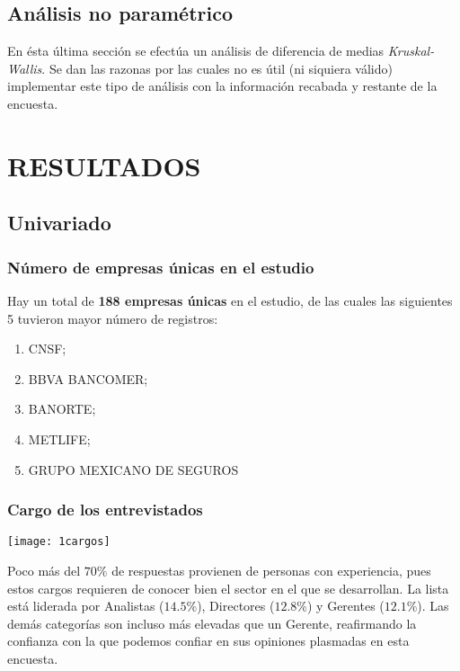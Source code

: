 \documentclass{article}
\begin{document}
\subsection{Análisis no paramétrico}

En ésta última sección se efectúa un análisis de diferencia de medias \textit{Kruskal-Wallis}. Se dan las razonas por las cuales no es útil (ni siquiera válido) implementar este tipo de análisis con la información recabada y restante de la encuesta. 
    
\newpage

\section{RESULTADOS}

\subsection{Univariado}

\subsubsection{Número de empresas únicas en el estudio}

Hay un total de \textbf{188 empresas únicas} en el estudio, de las cuales las siguientes 5 tuvieron mayor número de registros:

\begin{enumerate}
    \item CNSF;
    
    \item BBVA BANCOMER;
    
    \item BANORTE;
    
    \item METLIFE;
    
    \item GRUPO MEXICANO DE SEGUROS
\end{enumerate}

\subsubsection{Cargo de los entrevistados}

\begin{center}
    \texttt{[image: 1cargos]}
\end{center}

Poco más del $70\%$ de respuestas provienen de personas con experiencia, pues estos cargos requieren de conocer bien el sector en el que se desarrollan. La lista está liderada por Analistas ($14.5\%$), Directores ($12.8\%$) y Gerentes ($12.1\%$). Las demás categorías son incluso más elevadas que un Gerente, reafirmando la confianza con la que podemos confiar en sus opiniones plasmadas en esta encuesta. 
\end{document}

